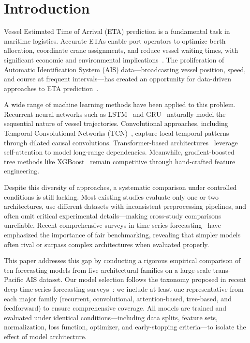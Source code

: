 \documentclass[sigconf,anonymous]{acmart}%
\begin{document}

\maketitle

\section{Introduction}

Vessel Estimated Time of Arrival (ETA) prediction is a fundamental task in maritime logistics.
Accurate ETAs enable port operators to optimize berth allocation, coordinate crane assignments, and reduce vessel waiting times, with significant economic and environmental implications~\cite{unctad2023}.
The proliferation of Automatic Identification System (AIS) data---broadcasting vessel position, speed, and course at frequent intervals---has created an opportunity for data-driven approaches to ETA prediction~\cite{fang2022}.

A wide range of machine learning methods have been applied to this problem.
Recurrent neural networks such as LSTM~\cite{zhang2022lstm} and GRU~\cite{han2021gru} naturally model the sequential nature of vessel trajectories.
Convolutional approaches, including Temporal Convolutional Networks (TCN)~\cite{bai2018tcn}, capture local temporal patterns through dilated causal convolutions.
Transformer-based architectures~\cite{dong2023transformer, zhou2021informer} leverage self-attention to model long-range dependencies.
Meanwhile, gradient-boosted tree methods like XGBoost~\cite{chen2016xgboost} remain competitive through hand-crafted feature engineering.

Despite this diversity of approaches, a systematic comparison under controlled conditions is still lacking.
Most existing studies evaluate only one or two architectures, use different datasets with inconsistent preprocessing pipelines, and often omit critical experimental details---making cross-study comparisons unreliable.
Recent comprehensive surveys in time-series forecasting~\cite{kim2025comprehensive, zeng2023transformers} have emphasized the importance of fair benchmarking, revealing that simpler models often rival or surpass complex architectures when evaluated properly.

This paper addresses this gap by conducting a rigorous empirical comparison of ten forecasting models from five architectural families on a large-scale trans-Pacific AIS dataset.
Our model selection follows the taxonomy proposed in recent deep time-series forecasting surveys~\cite{kim2025comprehensive}: we include at least one representative from each major family (recurrent, convolutional, attention-based, tree-based, and feedforward) to ensure comprehensive coverage.
All models are trained and evaluated under identical conditions---including data splits, feature sets, normalization, loss function, optimizer, and early-stopping criteria---to isolate the effect of model architecture.
\end{document}

